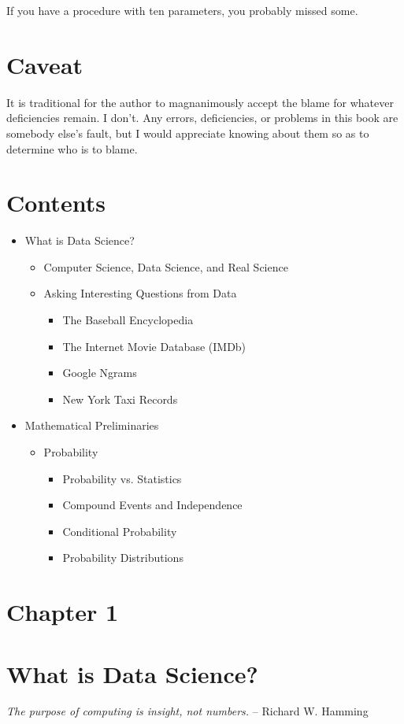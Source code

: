 \documentclass[10pt]{article}
\begin{document}
If you have a procedure with ten parameters, you probably missed some.

\section*{Caveat}
It is traditional for the author to magnanimously accept the blame for whatever deficiencies remain. I don't. Any errors, deficiencies, or problems in this book are somebody else's fault, but I would appreciate knowing about them so as to determine who is to blame.

\section*{Contents}
\begin{itemize}
  \item What is Data Science?
  \begin{itemize}
    \item Computer Science, Data Science, and Real Science
    \item Asking Interesting Questions from Data
    \begin{itemize}
      \item The Baseball Encyclopedia
      \item The Internet Movie Database (IMDb)
      \item Google Ngrams
      \item New York Taxi Records
    \end{itemize}
  \end{itemize}
  \item Mathematical Preliminaries
  \begin{itemize}
    \item Probability
    \begin{itemize}
      \item Probability vs. Statistics
      \item Compound Events and Independence
      \item Conditional Probability
      \item Probability Distributions
    \end{itemize}
  \end{itemize}
\end{itemize}

\section*{Chapter 1}
\section*{What is Data Science?}
\textit{The purpose of computing is insight, not numbers.} -- Richard W. Hamming
\end{document}
